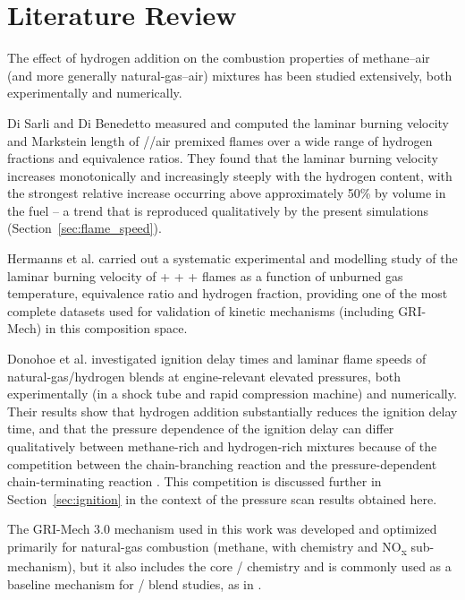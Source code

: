 \documentclass[11pt,a4paper]{article}
\begin{document}
\section{Literature Review}

The effect of hydrogen addition on the combustion properties of methane--air (and more generally natural-gas--air)
mixtures has been studied extensively, both experimentally and numerically.

Di Sarli and Di Benedetto \cite{disarli2007} measured and computed the laminar burning velocity and Markstein length
of //air premixed flames over a wide range of hydrogen fractions and equivalence ratios. They found
that the laminar burning velocity increases monotonically and increasingly steeply with the hydrogen content, with
the strongest relative increase occurring above approximately 50\%  by volume in the fuel -- a trend that is
reproduced qualitatively by the present simulations (Section~\ref{sec:flame_speed}).

Hermanns et al. \cite{hermanns2010} carried out a systematic experimental and modelling study of the laminar burning
velocity of  +  +  +  flames as a function of unburned gas temperature, equivalence
ratio and hydrogen fraction, providing one of the most complete datasets used for validation of kinetic mechanisms
(including GRI-Mech) in this composition space.

Donohoe et al. \cite{donohoe2014} investigated ignition delay times and laminar flame speeds of natural-gas/hydrogen
blends at engine-relevant elevated pressures, both experimentally (in a shock tube and rapid compression machine)
and numerically. Their results show that hydrogen addition substantially reduces the ignition delay time, and that
the pressure dependence of the ignition delay can differ qualitatively between methane-rich and hydrogen-rich
mixtures because of the competition between the chain-branching reaction  and the pressure-dependent
chain-terminating reaction . This competition is discussed further in
Section~\ref{sec:ignition} in the context of the pressure scan results obtained here.

The GRI-Mech 3.0 mechanism \cite{gri30} used in this work was developed and optimized primarily for natural-gas
combustion (methane, with  chemistry and NO\textsubscript{x} sub-mechanism), but it also includes the core
/ chemistry and is commonly used as a baseline mechanism for / blend studies, as in
\cite{disarli2007,hermanns2010,donohoe2014}.
\end{document}
